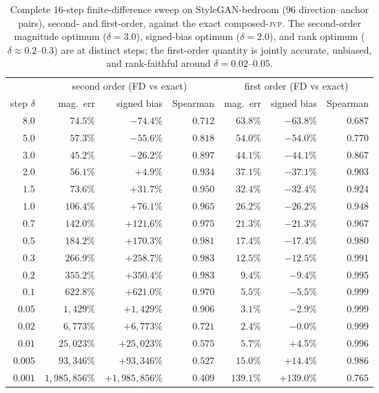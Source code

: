 \documentclass[10pt]{article}
\newcommand{\jvp}{\textsc{jvp}}
\begin{document}
\begin{table}[h]\centering
\small
\begin{tabular}{r rrr rrr}
\toprule
& \multicolumn{3}{c}{second order (FD vs exact)} & \multicolumn{3}{c}{first order (FD vs exact)} \\
\cmidrule(lr){2-4}\cmidrule(lr){5-7}
step $\delta$ & mag.\ err & signed bias & Spearman & mag.\ err & signed bias & Spearman \\
\midrule
$8.0$   & $74.5\%$       & $-74.4\%$      & $0.712$ & $63.8\%$  & $-63.8\%$ & $0.687$ \\
$5.0$   & $57.3\%$       & $-55.6\%$      & $0.818$ & $54.0\%$  & $-54.0\%$ & $0.770$ \\
$3.0$   & $45.2\%$       & $-26.2\%$      & $0.897$ & $44.1\%$  & $-44.1\%$ & $0.867$ \\
$2.0$   & $56.1\%$       & $+4.9\%$       & $0.934$ & $37.1\%$  & $-37.1\%$ & $0.903$ \\
$1.5$   & $73.6\%$       & $+31.7\%$      & $0.950$ & $32.4\%$  & $-32.4\%$ & $0.924$ \\
$1.0$   & $106.4\%$      & $+76.1\%$      & $0.965$ & $26.2\%$  & $-26.2\%$ & $0.948$ \\
$0.7$   & $142.0\%$      & $+121.6\%$     & $0.975$ & $21.3\%$  & $-21.3\%$ & $0.967$ \\
$0.5$   & $184.2\%$      & $+170.3\%$     & $0.981$ & $17.4\%$  & $-17.4\%$ & $0.980$ \\
$0.3$   & $266.9\%$      & $+258.7\%$     & $0.983$ & $12.5\%$  & $-12.5\%$ & $0.991$ \\
$0.2$   & $355.2\%$      & $+350.4\%$     & $0.983$ & $9.4\%$   & $-9.4\%$  & $0.995$ \\
$0.1$   & $622.8\%$      & $+621.0\%$     & $0.970$ & $5.5\%$   & $-5.5\%$  & $0.999$ \\
$0.05$  & $1{,}429\%$    & $+1{,}429\%$   & $0.906$ & $3.1\%$   & $-2.9\%$  & $0.999$ \\
$0.02$  & $6{,}773\%$    & $+6{,}773\%$   & $0.721$ & $2.4\%$   & $-0.0\%$  & $0.999$ \\
$0.01$  & $25{,}023\%$   & $+25{,}023\%$  & $0.575$ & $5.7\%$   & $+4.5\%$  & $0.996$ \\
$0.005$ & $93{,}346\%$   & $+93{,}346\%$  & $0.527$ & $15.0\%$  & $+14.4\%$ & $0.986$ \\
$0.001$ & $1{,}985{,}856\%$ & $+1{,}985{,}856\%$ & $0.409$ & $139.1\%$ & $+139.0\%$ & $0.765$ \\
\bottomrule
\end{tabular}
\caption{Complete $16$-step finite-difference sweep on StyleGAN-bedroom ($96$ direction--anchor pairs),
second- and first-order, against the exact composed-\jvp{}. The second-order magnitude optimum
($\delta=3.0$), signed-bias optimum ($\delta=2.0$), and rank optimum ($\delta\approx0.2$--$0.3$) are at
distinct steps; the first-order quantity is jointly accurate, unbiased, and rank-faithful around
$\delta=0.02$--$0.05$.}
\label{tab:fullsweep}
\end{table}
\end{document}

